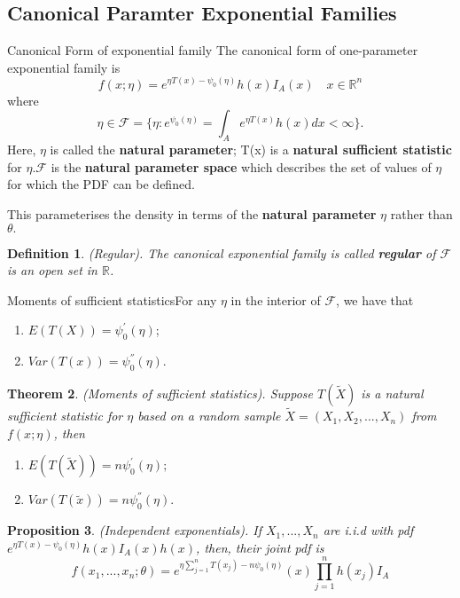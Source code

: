 \documentclass[twoside]{article}
\newcounter{lecnum}
\newtheorem{theorem}{Theorem}[lecnum]
\newtheorem{proposition}[theorem]{Proposition}
\newtheorem{definition}[theorem]{Definition}
\begin{document}
\subsection{Canonical Paramter Exponential Families}

\begin{definition_exam}{Canonical Form of exponential family}{} The canonical form of one-parameter exponential family is 
$$
f(x; \eta) = e^{\eta T(x) - \psi_0(\eta)}h(x)I_{A}(x) \quad x \in \mathbb{R}^n
$$
where 
$$
\eta \in \mathcal{F} = \{\eta: e^{\psi_0(\eta)} = \int_{A}e^{\eta T(x)}h(x)dx < \infty\}.
$$
Here, $\eta$ is called the \textbf{natural parameter}; T(x) is a \textbf{natural sufficient statistic} for $\eta$.\newline $\mathcal{F}$ is the \textbf{natural parameter space} which describes the set of values of $\eta$ for which the PDF can be defined.
\end{definition_exam}

This parameterises the density in terms of the \textbf{natural parameter} $\eta$ rather than $\theta.$

\begin{definition}(Regular). The canonical exponential family is called \textbf{regular} of $\mathcal{F}$ is an open set in $\mathbb{R}$.
\end{definition}

\begin{theorem_exam}{Moments of sufficient statistics}{}For any $\eta$ in the interior of $\mathcal{F}$, we have that
\begin{enumerate}
\item $E(T(X)) = \psi_{0}^{'}(\eta)$;
\item $Var(T(x)) = \psi_{0}^{''}(\eta).$
\end{enumerate}
\end{theorem_exam}


\begin{theorem}(Moments of sufficient statistics). Suppose $T(\tilde{X})$ is a natural sufficient statistic for $\eta$ based on a random sample $\tilde{X} = (X_1,X_2,...,X_n)$ from $f(x; \eta)$, then 
\begin{enumerate}
\item $E(T(\tilde{X})) = n\psi_{0}^{'}(\eta);$
\item $Var(T(\tilde{x})) = n\psi_{0}^{''}(\eta).$
\end{enumerate}
\end{theorem}

\begin{proposition}(Independent exponentials). If $X_1,...,X_n$ are i.i.d with pdf $e^{\eta T(x) - \psi_0(\eta)}h(x)I_{A}(x)h(x)$, then, their joint pdf is 
$$
f(x_1,...,x_n;\theta) = e^{\eta \sum_{j=1}^{n}T(x_j) - n\psi_0(\eta)}(x)\prod_{j=1}^nh(x_j)I_{A}
$$
\end{proposition}
\end{document}
